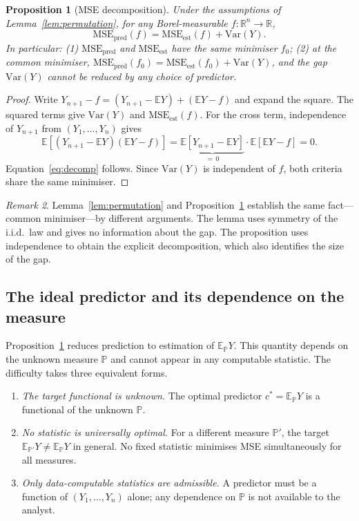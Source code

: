 \documentclass[a4paper,oneside,12pt]{extarticle}
\theoremstyle{plain}
\newtheorem{proposition}{Proposition}
\theoremstyle{definition}
\theoremstyle{remark}
\newtheorem{remark}[proposition]{Remark}
\newcommand*{\E}{\mathbb{E}}
\newcommand*{\mbR}{\mathbb{R}}
\newcommand*{\mP}{\mathbb{P}}
\begin{document}
\begin{proposition}[MSE decomposition]
\label{prop:decomp}
Under the assumptions of Lemma~\ref{lem:permutation}, for any
Borel-measurable $f:\mbR^n\to\mbR$,
\begin{equation}
\label{eq:decomp}
\mathrm{MSE}_{\mathrm{pred}}(f)
= \mathrm{MSE}_{\mathrm{est}}(f) + \mathrm{Var}(Y).
\end{equation}
In particular: \emph{(1)} $\mathrm{MSE}_{\mathrm{pred}}$ and
$\mathrm{MSE}_{\mathrm{est}}$ have the same minimiser $f_0$; \emph{(2)}
at the common minimiser,
$\mathrm{MSE}_{\mathrm{pred}}(f_0) = \mathrm{MSE}_{\mathrm{est}}(f_0) +
\mathrm{Var}(Y)$, and the gap $\mathrm{Var}(Y)$ cannot be reduced by any
choice of predictor.
\end{proposition}

\begin{proof}
Write $Y_{n+1} - f = (Y_{n+1} - \E Y) + (\E Y - f)$ and expand the
square. The squared terms give $\mathrm{Var}(Y)$ and
$\mathrm{MSE}_{\mathrm{est}}(f)$. For the cross term, independence of
$Y_{n+1}$ from $(Y_1,\ldots,Y_n)$ gives
\[
\E[(Y_{n+1}-\E Y)(\E Y - f)] =
\underbrace{\E[Y_{n+1}-\E Y]}_{=\,0} \cdot \E[\E Y - f] = 0.
\]
Equation~\eqref{eq:decomp} follows. Since $\mathrm{Var}(Y)$ is
independent of $f$, both criteria share the same minimiser.
\end{proof}

\begin{remark}
Lemma~\ref{lem:permutation} and Proposition~\ref{prop:decomp} establish
the same fact---common minimiser---by different arguments. The lemma uses
symmetry of the i.i.d.\ law and gives no information about the gap. The
proposition uses independence to obtain the explicit decomposition, which
also identifies the size of the gap.
\end{remark}

\subsection{The ideal predictor and its dependence on the measure}

Proposition~\ref{prop:decomp} reduces prediction to estimation of
$\E_\mP Y$. This quantity depends on the unknown measure $\mP$ and
cannot appear in any computable statistic. The difficulty takes three
equivalent forms.

\begin{enumerate}[label=(\roman*)]
\item \textit{The target functional is unknown.}
  The optimal predictor $c^* = \E_\mP Y$ is a functional of the unknown
  $\mP$.
\item \textit{No statistic is universally optimal.}
  For a different measure $\mP'$, the target $\E_{\mP'} Y \neq \E_\mP Y$
  in general. No fixed statistic minimises MSE simultaneously for all
  measures.
\item \textit{Only data-computable statistics are admissible.}
  A predictor must be a function of $(Y_1,\ldots,Y_n)$ alone; any
  dependence on $\mP$ is not available to the analyst.
\end{enumerate}
\end{document}
